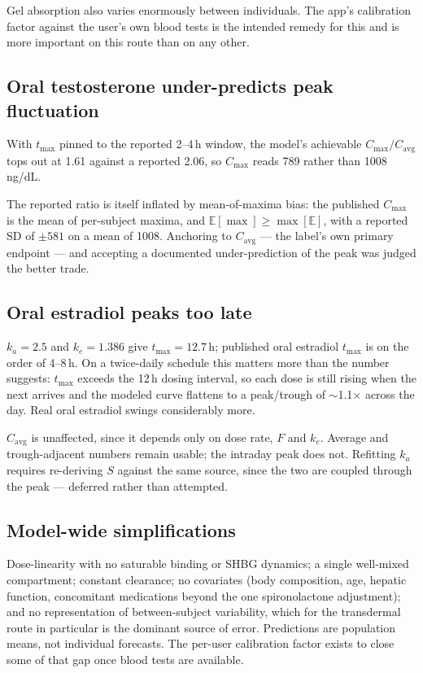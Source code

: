 \documentclass[11pt,a4paper]{article}
\begin{document}
Gel absorption also varies enormously between individuals. The app's calibration
factor against the user's own blood tests is the intended remedy for this and is
more important on this route than on any other.

\subsection{Oral testosterone under-predicts peak fluctuation}

With $t_{\max}$ pinned to the reported 2--4\,h window, the model's achievable
$C_{\max}/C_{\mathrm{avg}}$ tops out at 1.61 against a reported 2.06, so
$C_{\max}$ reads 789 rather than 1008\,ng/dL.

The reported ratio is itself inflated by mean-of-maxima bias: the published
$C_{\max}$ is the mean of per-subject maxima, and $\mathbb{E}[\max] \ge
\max[\mathbb{E}]$, with a reported SD of $\pm 581$ on a mean of 1008. Anchoring
to $C_{\mathrm{avg}}$ --- the label's own primary endpoint --- and accepting a
documented under-prediction of the peak was judged the better trade.

\subsection{Oral estradiol peaks too late}

$k_a = 2.5$ and $k_e = 1.386$ give $t_{\max} = 12.7$\,h; published oral estradiol
$t_{\max}$ is on the order of 4--8\,h. On a twice-daily schedule this matters
more than the number suggests: $t_{\max}$ exceeds the 12\,h dosing interval, so
each dose is still rising when the next arrives and the modeled curve flattens to
a peak/trough of $\sim$1.1$\times$ across the day. Real oral estradiol swings
considerably more.

$C_{\mathrm{avg}}$ is unaffected, since it depends only on dose rate, $F$ and
$k_e$. Average and trough-adjacent numbers remain usable; the intraday peak does
not. Refitting $k_a$ requires re-deriving $S$ against the same source, since the
two are coupled through the peak --- deferred rather than attempted.

\subsection{Model-wide simplifications}

Dose-linearity with no saturable binding or SHBG dynamics; a single well-mixed
compartment; constant clearance; no covariates (body composition, age, hepatic
function, concomitant medications beyond the one spironolactone adjustment); and
no representation of between-subject variability, which for the transdermal route
in particular is the dominant source of error. Predictions are population means,
not individual forecasts. The per-user calibration factor exists to close some of
that gap once blood tests are available.
\end{document}
